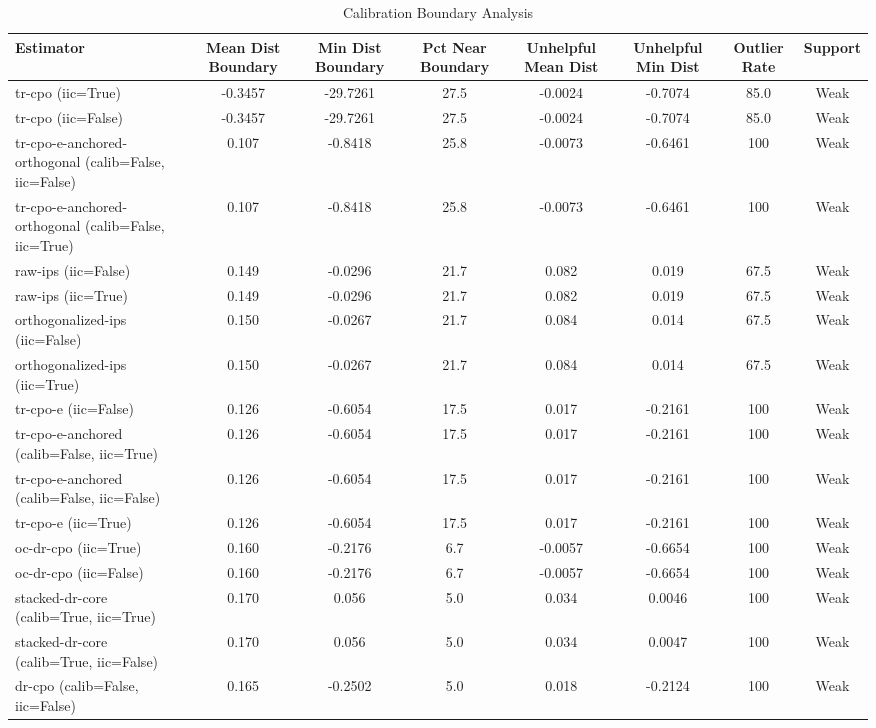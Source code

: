 \begin{table}[htbp]
\centering
\caption{Calibration Boundary Analysis}
\label{tab:A5}
\begin{tabular}{l|ccccccc}
\toprule
Estimator & Mean Dist Boundary & Min Dist Boundary & Pct Near Boundary & Unhelpful Mean Dist & Unhelpful Min Dist & Outlier Rate & Support \\
\midrule
tr-cpo (iic=True) & -0.3457 & -29.7261 & 27.5 & -0.0024 & -0.7074 & 85.0 & Weak \\
tr-cpo (iic=False) & -0.3457 & -29.7261 & 27.5 & -0.0024 & -0.7074 & 85.0 & Weak \\
tr-cpo-e-anchored-orthogonal (calib=False, iic=False) & 0.107 & -0.8418 & 25.8 & -0.0073 & -0.6461 & 100 & Weak \\
tr-cpo-e-anchored-orthogonal (calib=False, iic=True) & 0.107 & -0.8418 & 25.8 & -0.0073 & -0.6461 & 100 & Weak \\
raw-ips (iic=False) & 0.149 & -0.0296 & 21.7 & 0.082 & 0.019 & 67.5 & Weak \\
raw-ips (iic=True) & 0.149 & -0.0296 & 21.7 & 0.082 & 0.019 & 67.5 & Weak \\
orthogonalized-ips (iic=False) & 0.150 & -0.0267 & 21.7 & 0.084 & 0.014 & 67.5 & Weak \\
orthogonalized-ips (iic=True) & 0.150 & -0.0267 & 21.7 & 0.084 & 0.014 & 67.5 & Weak \\
tr-cpo-e (iic=False) & 0.126 & -0.6054 & 17.5 & 0.017 & -0.2161 & 100 & Weak \\
tr-cpo-e-anchored (calib=False, iic=True) & 0.126 & -0.6054 & 17.5 & 0.017 & -0.2161 & 100 & Weak \\
tr-cpo-e-anchored (calib=False, iic=False) & 0.126 & -0.6054 & 17.5 & 0.017 & -0.2161 & 100 & Weak \\
tr-cpo-e (iic=True) & 0.126 & -0.6054 & 17.5 & 0.017 & -0.2161 & 100 & Weak \\
oc-dr-cpo (iic=True) & 0.160 & -0.2176 & 6.7 & -0.0057 & -0.6654 & 100 & Weak \\
oc-dr-cpo (iic=False) & 0.160 & -0.2176 & 6.7 & -0.0057 & -0.6654 & 100 & Weak \\
stacked-dr-core (calib=True, iic=True) & 0.170 & 0.056 & 5.0 & 0.034 & 0.0046 & 100 & Weak \\
stacked-dr-core (calib=True, iic=False) & 0.170 & 0.056 & 5.0 & 0.034 & 0.0047 & 100 & Weak \\
dr-cpo (calib=False, iic=False) & 0.165 & -0.2502 & 5.0 & 0.018 & -0.2124 & 100 & Weak \\

\end{tabular}
\end{table}
